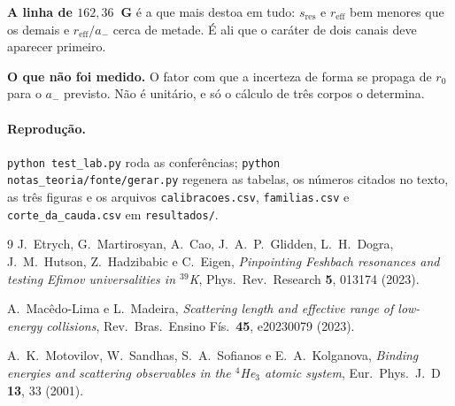 \documentclass[11pt,a4paper]{article}
\newcommand{\cod}[1]{\texttt{\small #1}}
\begin{document}
\textbf{A linha de $162{,}36$~G} é a que mais destoa em tudo: $s_\mathrm{res}$ e
$r_\mathrm{eff}$ bem menores que os demais e $r_\mathrm{eff}/a_-$ cerca de metade. É
ali que o caráter de dois canais deve aparecer primeiro.

\textbf{O que não foi medido.} O fator com que a incerteza de forma se propaga
de $r_0$ para o $a_-$ previsto. Não é unitário, e só o cálculo de três corpos
o determina.

\paragraph{Reprodução.} \cod{python test\_lab.py} roda as conferências;
\cod{python notas\_teoria/fonte/gerar.py} regenera as tabelas, os números
citados no texto, as três figuras e os arquivos \cod{calibracoes.csv},
\cod{familias.csv} e \cod{corte\_da\_cauda.csv} em \cod{resultados/}.

\begin{thebibliography}{9}\small
{}
J.~Etrych, G.~Martirosyan, A.~Cao, J.~A.~P.~Glidden, L.~H.~Dogra,
J.~M.~Hutson, Z.~Hadzibabic e C.~Eigen,
\textit{Pinpointing Feshbach resonances and testing Efimov universalities in
$^{39}$K}, Phys.\ Rev.\ Research \textbf{5}, 013174 (2023).

A.~Macêdo-Lima e L.~Madeira,
\textit{Scattering length and effective range of low-energy collisions},
Rev.\ Bras.\ Ensino Fís.\ \textbf{45}, e20230079 (2023).

A.~K.~Motovilov, W.~Sandhas, S.~A.~Sofianos e E.~A.~Kolganova,
\textit{Binding energies and scattering observables in the $^4$He$_3$ atomic
system}, Eur.\ Phys.\ J.\ D \textbf{13}, 33 (2001).
\end{thebibliography}
\end{document}
